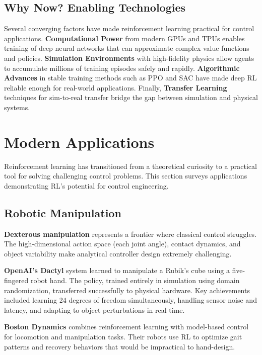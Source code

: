 \subsection{Why Now? Enabling Technologies}

Several converging factors have made reinforcement learning practical for control applications. \textbf{Computational Power} from modern GPUs and TPUs enables training of deep neural networks that can approximate complex value functions and policies. \textbf{Simulation Environments} with high-fidelity physics allow agents to accumulate millions of training episodes safely and rapidly. \textbf{Algorithmic Advances} in stable training methods such as PPO and SAC have made deep RL reliable enough for real-world applications. Finally, \textbf{Transfer Learning} techniques for sim-to-real transfer bridge the gap between simulation and physical systems.

\section{Modern Applications}
\label{sec:rl_applications}

Reinforcement learning has transitioned from a theoretical curiosity to a practical tool for solving challenging control problems. This section surveys applications demonstrating RL's potential for control engineering.

\subsection{Robotic Manipulation}

\textbf{Dexterous manipulation} represents a frontier where classical control struggles. The high-dimensional action space (each joint angle), contact dynamics, and object variability make analytical controller design extremely challenging.

\textbf{OpenAI's Dactyl} system learned to manipulate a Rubik's cube using a five-fingered robot hand. The policy, trained entirely in simulation using domain randomization, transferred successfully to physical hardware. Key achievements included learning 24 degrees of freedom simultaneously, handling sensor noise and latency, and adapting to object perturbations in real-time.

\textbf{Boston Dynamics} combines reinforcement learning with model-based control for locomotion and manipulation tasks. Their robots use RL to optimize gait patterns and recovery behaviors that would be impractical to hand-design.

